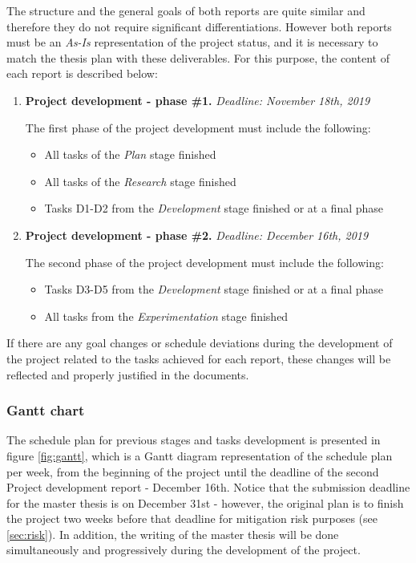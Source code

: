 \documentclass[11pt]{article}
\begin{document}
The structure and the general goals of both reports are quite similar and therefore they do not require significant differentiations. However both reports must be an \textit{As-Is} representation of the project status, and it is necessary to match the thesis plan with these deliverables. For this purpose, the content of each report is described below:

\begin{enumerate}
\item \textbf{Project development - phase \#1.} \textit{Deadline: November 18th, 2019}

The first phase of the project development must include the following:
\begin{itemize}
\item All tasks of the \textit{Plan} stage finished
\item All tasks of the \textit{Research} stage finished
\item Tasks D1-D2 from the \textit{Development} stage finished or at a final phase
\end{itemize}
\item \textbf{Project development - phase \#2.} \textit{Deadline: December 16th, 2019} 

The second phase of the project development must include the following:
\begin{itemize}
\item Tasks D3-D5 from the \textit{Development} stage finished or at a final phase
\item All tasks from the \textit{Experimentation} stage finished
\end{itemize}

\end{enumerate}

If there are any goal changes or schedule deviations during the development of the project related to the tasks achieved for each report, these changes will be reflected and properly justified in the documents.

\subsubsection{Gantt chart}

The schedule plan for previous stages and tasks development is presented in figure \ref{fig:gantt}, which is a Gantt diagram representation of the schedule plan per week, from the beginning of the project until the deadline of the second Project development report - December 16th. Notice that the submission deadline for the master thesis is on December 31st - however, the original plan is to finish the project two weeks before that deadline for mitigation risk purposes (see \ref{sec:risk}). In addition, the writing of the master thesis will be done simultaneously and progressively during the development of the project.
\end{document}
